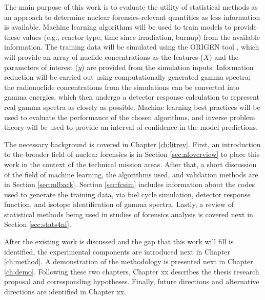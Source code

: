 The main purpose of this work is to evaluate the utility of statistical methods
as an approach to determine nuclear forensics-relevant quantities as less
information is available. Machine learning algorithms will be used to train
models to provide these values (e.g., reactor type, time since irradiation,
burnup) from the available information. The training data will be simulated
using the ORIGEN tool , which will provide an array of nuclide
concentrations as the features ($X$) and the parameters of interest ($y$) are
provided from the simulation inputs.  Information reduction will be carried out
using computationally generated gamma spectra; the radionuclide concentrations
from the simulations can be converted into gamma energies, which then undergo a
detector response calculation to represent real gamma spectra as closely as
possible. Machine learning best practices will be used to evaluate the
performance of the chosen algorithms, and inverse problem theory will
be used to provide an interval of confidence in the model predictions.

The necessary background is covered in Chapter \ref{ch:litrev}.  First, an
introduction to the broader field of nuclear forensics is in Section
\ref{sec:nfoverview} to place this work in the context of the technical mission
areas. After that, a short discussion of the field of machine learning, the
algorithms used, and validation methods are in Section \ref{sec:mlback}.
Section \ref{sec:fcsim} includes information about the codes used to generate
the training data, via fuel cycle simulation, detector response function, and
isotope identification of gamma spectra.  Lastly, a review of statistical
methods being used in studies of forensics analysis is covered next in Section
\ref{sec:stats4nf}. 


After the existing work is discussed and the gap that this work will fill is
identified, the experimental components are introduced next in Chapter
\ref{ch:method}. A demonstration of the methodology is presented next in Chapter
\ref{ch:demo}. Following these two chapters, Chapter xx %
describes the thesis research proposal and corresponding hypotheses. 
Finally, future directions and alternative directions are identified in 
Chapter xx. %
